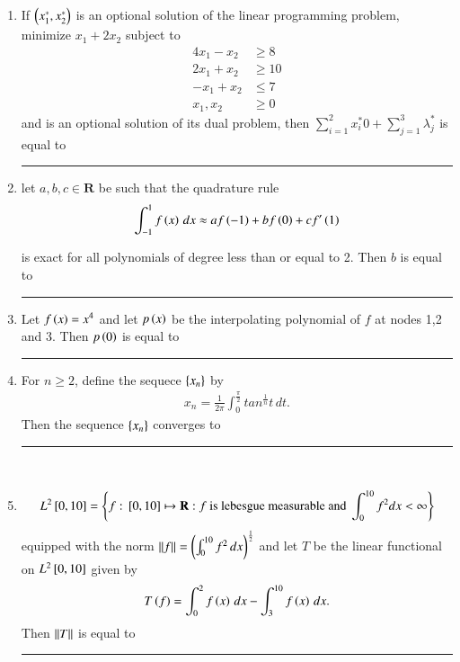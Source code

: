 \documentclass[journal]{IEEEtran}
\numberwithin{equation}{enumi}
\numberwithin{figure}{enumi}
\begin{document}
	\begin{enumerate}
		\item 
		If $\left(x_1^*, x_2^*\right)$ is an optional solution of the linear programming problem, minimize $x_1 + 2x_2$ subject to 
		\begin{align*}
			4x_1 - x_2 & \geq 8\\
			2x_1 + x_2 & \geq 10\\
			-x_1 + x_2 & \leq 7\\
			x_1, x_2 & \geq 0
		\end{align*}
		and  is an optional solution of its dual problem, then $\sum_{i = 1}^2 x_i^*0 + \sum_{j = 1}^3 \lambda_j^*$ is equal to \rule{2cm}{0.1pt} 

		\item 
		let $a, b, c \in \mathbf{R}$ be such that the quadrature rule 
		\begin{align*}
			\int_{-1}^1 f\left(x\right)\, dx \approx af\left(-1\right) + bf\left(0\right) + cf^\prime\left(1\right) 
		\end{align*}

		is exact for all polynomials of degree less than or equal to 2. Then $b$ is equal to \rule{2cm}{0.1pt} 

		\item 
		Let $f\left(x\right) = x^4$ and let $p\left(x\right)$ be the interpolating polynomial of $f$ at nodes 1,2 and 3. Then $p\left(0\right)$ is equal to \rule{2cm}{0.1pt}

		\item
		For $n \geq 2$, define the sequece $\left\{x_n\right\}$ by 
		\begin{align*} 
			x_n = \frac{1}{2\pi}\int_0^{\frac{\pi}{2}} tan^{\frac{1}{n}}{t}\, dt. 
		\end{align*}
		Then the sequence $\left\{x_n\right\}$ converges to \rule{2cm}{0.1pt}\\ 

		\item 
		\begin{align*}
			L^2{}\left[0,10\right] = \left\{f:{}\left[0,10\right]\mapsto \mathbf{R}: f \text{ is lebesgue measurable and }\int_0^{10}f^2dx < \infty\right\}
		\end{align*}
		equipped with the norm $\left\lVert f\right\rVert = \left(\int_0^{10} f^2\, dx\right)^{\frac{1}{2}}$ and let $T$ be the linear functional on $L^2{}\left[0,10\right]$ given by 
		\begin{align*}
			T\left(f\right) = \int_0^2 f\left(x\right)\, dx - \int_3^{10} f\left(x\right)\, dx.
		\end{align*}
		Then $\left\lVert T\right\rVert$ is equal to \rule{2cm}{0.1pt}


\end{enumerate}
\end{document}
